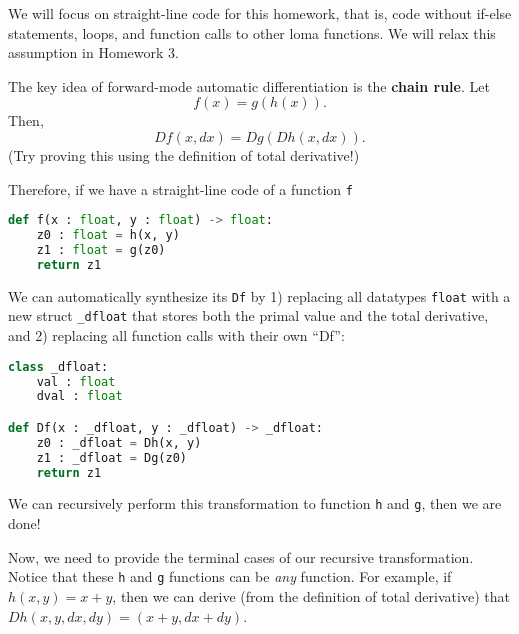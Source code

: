 We will focus on straight-line code for this homework, that is, code without if-else statements, loops, and function calls to other loma functions. We will relax this assumption in Homework 3. 

The key idea of forward-mode automatic differentiation is the \textbf{chain rule}. Let
\begin{equation}
	f(x) = g(h(x)).
\end{equation}
Then,
\begin{equation}
	Df(x, dx) = Dg(Dh(x, dx)).
\end{equation}
(Try proving this using the definition of total derivative!)

Therefore, if we have a straight-line code of a function \lstinline{f}
\begin{lstlisting}[language=Python]
def f(x : float, y : float) -> float:
	z0 : float = h(x, y)
	z1 : float = g(z0)
	return z1
\end{lstlisting}
We can automatically synthesize its \lstinline{Df} by 1) replacing all datatypes \lstinline{float} with a new struct \lstinline{_dfloat} that stores both the primal value and the total derivative, and 2) replacing all function calls with their own ``Df'':
\begin{lstlisting}[language=Python]
class _dfloat:
	val : float
	dval : float

def Df(x : _dfloat, y : _dfloat) -> _dfloat:
	z0 : _dfloat = Dh(x, y)
	z1 : _dfloat = Dg(z0)
	return z1
\end{lstlisting}
We can recursively perform this transformation to function \lstinline{h} and \lstinline{g}, then we are done!

Now, we need to provide the terminal cases of our recursive transformation. Notice that these \lstinline{h} and \lstinline{g} functions can be \emph{any} function. For example, if $h(x, y) = x + y$, then we can derive (from the definition of total derivative) that $Dh(x, y, dx, dy) = (x + y, dx + dy)$. 

